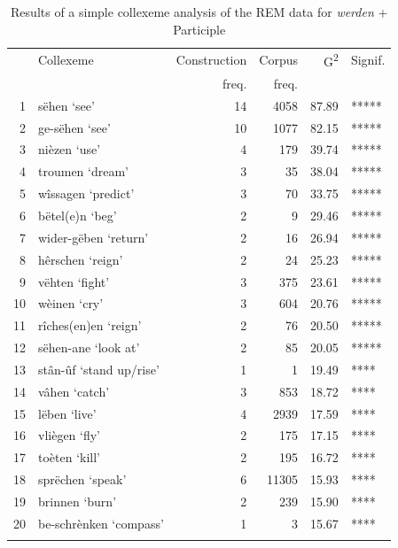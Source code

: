 \documentclass[output=paper,colorlinks,citecolor=brown]{langscibook}
\begin{document}
\begin{table}[ht]
\centering
\begin{tabular}{rlrrrl}
  \lsptoprule
 & Collexeme & Construction & Corpus & G\textsuperscript{2} & Signif. \\ 
 &  & freq. & freq. & & \\ 
  \midrule
1 & sëhen `see'&  14 & 4058 & 87.89 & ***** \\ 
  2 & ge-sëhen `see' &  10 & 1077 & 82.15 & ***** \\ 
  3 & nièzen `use'&   4 & 179 & 39.74 & ***** \\ 
  4 & troumen `dream'&   3 &  35 & 38.04 & ***** \\ 
  5 & wîssagen `predict'&   3 &  70 & 33.75 & ***** \\ 
  6 & bëtel(e)n `beg'&   2 &   9 & 29.46 & ***** \\ 
  7 & wider-gëben `return'&   2 &  16 & 26.94 & ***** \\ 
  8 & hêrschen `reign'&   2 &  24 & 25.23 & ***** \\ 
  9 & vëhten `fight' &   3 & 375 & 23.61 & ***** \\ 
  10 & wèinen `cry'&   3 & 604 & 20.76 & ***** \\ 
  11 & rîches(en)en `reign'&   2 &  76 & 20.50 & ***** \\ 
  12 & sëhen-ane `look at' &   2 &  85 & 20.05 & ***** \\ 
  13 & stân-ûf `stand up/rise' &   1 &   1 & 19.49 & **** \\ 
  14 & vâhen `catch'&   3 & 853 & 18.72 & **** \\ 
  15 & lëben `live'&   4 & 2939 & 17.59 & **** \\ 
  16 & vliègen `fly'&   2 & 175 & 17.15 & **** \\ 
  17 & toèten `kill'&   2 & 195 & 16.72 & **** \\ 
  18 & sprëchen `speak'&   6 & 11305 & 15.93 & **** \\ 
  19 & brinnen `burn'&   2 & 239 & 15.90 & **** \\ 
  20 & be-schrènken `compass'&   1 &   3 & 15.67 & **** \\ 
   \lspbottomrule
\end{tabular}
\caption{Results of a simple collexeme analysis of the REM data for \textit{werden} + Participle} 
\label{simple_collex_werden_part_rem}
\end{table}

\end{document}

